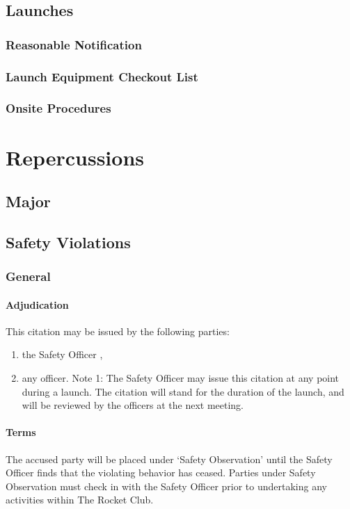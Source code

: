 \documentclass[12pt]{article}
\newcommand{\note}[1]{\raisebox{.5em}{\small Note #1}}
\begin{document}
\subsection{Launches}
\subsubsection{Reasonable Notification}
\subsubsection{Launch Equipment Checkout List}
\subsubsection{Onsite Procedures}
\section{Repercussions}
\subsection{Major}
\subsection{Safety Violations}
\subsubsection{General}
\label{citation:s.general}
\paragraph{Adjudication}
This citation may be issued by the following parties:
\begin{enumerate}[label=(\roman*)]
    \item the Safety Officer \note{1},
    \item any officer. \newline
    Note 1: The Safety Officer may issue this citation at any point during a launch.
    The citation will stand for the duration of the launch, 
    and will be reviewed by the officers at the next meeting.
\end{enumerate}
\paragraph{Terms}
\label{safob}
The accused party will be placed under `Safety Observation' until the Safety Officer finds that the violating behavior has ceased.
Parties under Safety Observation must check in with the Safety Officer prior to undertaking any activities within The Rocket Club.
\end{document}
